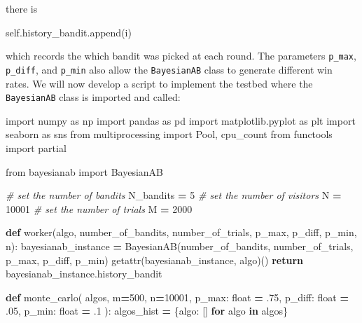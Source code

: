 \documentclass[
]{book}
\newenvironment{Shaded}{\begin{snugshade}}{\end{snugshade}}
\newcommand{\BuiltInTok}[1]{#1}
\newcommand{\CommentTok}[1]{\textcolor[rgb]{0.56,0.35,0.01}{\textit{#1}}}
\newcommand{\ControlFlowTok}[1]{\textcolor[rgb]{0.13,0.29,0.53}{\textbf{#1}}}
\newcommand{\DecValTok}[1]{\textcolor[rgb]{0.00,0.00,0.81}{#1}}
\newcommand{\FloatTok}[1]{\textcolor[rgb]{0.00,0.00,0.81}{#1}}
\newcommand{\ImportTok}[1]{#1}
\newcommand{\KeywordTok}[1]{\textcolor[rgb]{0.13,0.29,0.53}{\textbf{#1}}}
\newcommand{\NormalTok}[1]{#1}
\newcommand{\OperatorTok}[1]{\textcolor[rgb]{0.81,0.36,0.00}{\textbf{#1}}}
\newcommand{\VariableTok}[1]{\textcolor[rgb]{0.00,0.00,0.00}{#1}}
\theoremstyle{definition}
\theoremstyle{definition}
\theoremstyle{definition}
\theoremstyle{definition}
\theoremstyle{remark}
\begin{document}
there is

\begin{Shaded}
\begin{Highlighting}[]
\VariableTok{self}\NormalTok{.history\_bandit.append(i)}
\end{Highlighting}
\end{Shaded}

which records the which bandit was picked at each round. The parameters \texttt{p\_max}, \texttt{p\_diff}, and \texttt{p\_min} also allow the \texttt{BayesianAB} class to generate different win rates. We will now develop a script to implement the testbed where the \texttt{BayesianAB} class is imported and called:

\begin{Shaded}
\begin{Highlighting}[]
\ImportTok{import}\NormalTok{ numpy }\ImportTok{as}\NormalTok{ np}
\ImportTok{import}\NormalTok{ pandas }\ImportTok{as}\NormalTok{ pd}
\ImportTok{import}\NormalTok{ matplotlib.pyplot }\ImportTok{as}\NormalTok{ plt}
\ImportTok{import}\NormalTok{ seaborn }\ImportTok{as}\NormalTok{ sns}
\ImportTok{from}\NormalTok{ multiprocessing }\ImportTok{import}\NormalTok{ Pool, cpu\_count}
\ImportTok{from}\NormalTok{ functools }\ImportTok{import}\NormalTok{ partial}

\ImportTok{from}\NormalTok{ bayesianab }\ImportTok{import}\NormalTok{ BayesianAB}

\CommentTok{\# set the number of bandits}
\NormalTok{N\_bandits }\OperatorTok{=} \DecValTok{5}
\CommentTok{\# set the number of visitors}
\NormalTok{N }\OperatorTok{=} \DecValTok{10001}
\CommentTok{\# set the number of trials}
\NormalTok{M }\OperatorTok{=} \DecValTok{2000}


\KeywordTok{def}\NormalTok{ worker(algo, number\_of\_bandits, number\_of\_trials, p\_max, p\_diff, p\_min, n):}
\NormalTok{    bayesianab\_instance }\OperatorTok{=}\NormalTok{ BayesianAB(number\_of\_bandits, number\_of\_trials, p\_max, p\_diff, p\_min)}
    \BuiltInTok{getattr}\NormalTok{(bayesianab\_instance, algo)()}
    \ControlFlowTok{return}\NormalTok{ bayesianab\_instance.history\_bandit}


\KeywordTok{def}\NormalTok{ monte\_carlo(}
\NormalTok{        algos,}
\NormalTok{        m}\OperatorTok{=}\DecValTok{500}\NormalTok{,}
\NormalTok{        n}\OperatorTok{=}\DecValTok{10001}\NormalTok{,}
\NormalTok{        p\_max: }\BuiltInTok{float} \OperatorTok{=} \FloatTok{.75}\NormalTok{,}
\NormalTok{        p\_diff: }\BuiltInTok{float} \OperatorTok{=} \FloatTok{.05}\NormalTok{,}
\NormalTok{        p\_min: }\BuiltInTok{float} \OperatorTok{=} \FloatTok{.1}
\NormalTok{):}
\NormalTok{    algos\_hist }\OperatorTok{=}\NormalTok{ \{algo: [] }\ControlFlowTok{for}\NormalTok{ algo }\KeywordTok{in}\NormalTok{ algos\}}


\end{Highlighting}
\end{Shaded}
\end{document}
